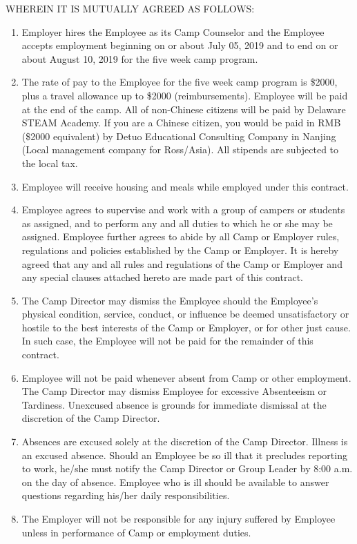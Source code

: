 \documentclass{rossasia}
\begin{document}
WHEREIN IT IS MUTUALLY AGREED AS FOLLOWS:
\begin{enumerate}
\item	Employer hires the Employee as its Camp Counselor and the Employee accepts employment beginning on or about July 05, 2019 and to end on or about August 10, 2019 for the five week camp program.
\item	The rate of pay to the Employee for the five week camp program is \$2000, 
plus a travel allowance up to \$2000 (reimbursements).  Employee will be paid 
at the end of the camp. All of non-Chinese citizens will be paid by Delaware STEAM Academy. 
If you are a Chinese citizen, you would be paid in RMB (\$2000 equivalent) by
 Detuo Educational Consulting Company in Nanjing (Local management company 
 for Ross/Asia). All stipends are subjected to the local tax. 
\item	 Employee will receive housing and meals while employed under this contract. 
\item Employee agrees to supervise and work with a group of campers or students as assigned, and to perform any and all duties to which he or she may be assigned. Employee further agrees to abide by all Camp or Employer rules, regulations and policies established by the Camp or Employer. It is hereby agreed that any and all rules and regulations of the Camp or Employer and any special clauses attached hereto are made part of this contract. 
\item The Camp Director may dismiss the Employee should the Employee's physical condition, service, conduct, or influence be deemed unsatisfactory or hostile to the best interests of the Camp or Employer, or for other just cause. In such case, the Employee will not be paid for the remainder of this contract. 
\item Employee will not be paid whenever absent from Camp or other employment.  The Camp Director may dismiss Employee for excessive Absenteeism or Tardiness. \linebreak
Unexcused absence is grounds for immediate dismissal at the discretion of the Camp Director.
\pagebreak
\item Absences are excused solely at the discretion of the Camp Director. Illness is an excused absence.  Should an Employee be so ill that it precludes reporting to work, he/she must notify the Camp Director or Group Leader by 8:00 a.m. on the day of absence. Employee who is ill should be available to answer questions regarding his/her daily responsibilities. 
\item The Employer will not be responsible for any injury suffered by Employee unless in performance of Camp or employment duties.

\end{enumerate}
\end{document}
